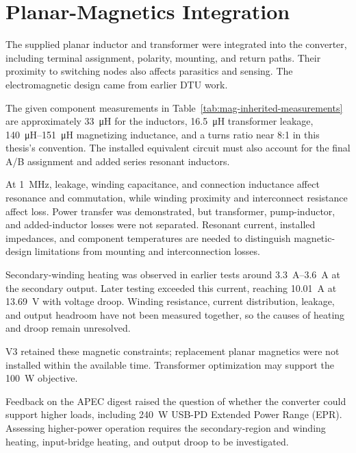 \section{Planar-Magnetics Integration}
\label{sec:disc-magnetics}

The supplied planar inductor and transformer were integrated into the
converter, including terminal assignment, polarity, mounting, and return
paths. Their proximity to switching nodes also affects parasitics and
sensing. The electromagnetic design came from earlier DTU work.

The given component measurements in Table~\ref{tab:mag-inherited-measurements}
are approximately \SI{33}{\micro\henry} for the inductors,
\SI{16.5}{\micro\henry} transformer leakage,
\SIrange{140}{151}{\micro\henry} magnetizing inductance, and a turns
ratio near 8:1 in this thesis's convention. The installed equivalent
circuit must also account for the final A/B assignment and added series
resonant inductors.

At \SI{1}{\mega\hertz}, leakage, winding capacitance, and connection
inductance affect resonance and commutation, while winding proximity and
interconnect resistance affect loss. Power transfer was demonstrated,
but transformer, pump-inductor, and added-inductor losses were not
separated. Resonant current, installed impedances, and component
temperatures are needed to distinguish magnetic-design limitations from
mounting and interconnection losses.

Secondary-winding heating was observed in earlier tests around \SIrange{3.3}{3.6}{\ampere} at the secondary output. Later testing exceeded this current, reaching \SI{10.01}{\ampere} at \SI{13.69}{\volt} with voltage droop. Winding resistance, current distribution, leakage, and output headroom have not been measured together, so the causes of heating and droop remain unresolved.

V3 retained these magnetic constraints; replacement planar magnetics were
not installed within the available time. Transformer optimization may
support the \SI{100}{\watt} objective.

Feedback on the APEC digest raised the question of whether the converter
could support higher loads, including \SI{240}{\watt} USB-PD Extended
Power Range (EPR). Assessing higher-power operation requires the secondary-region and winding heating, input-bridge heating, and output droop to be investigated.

